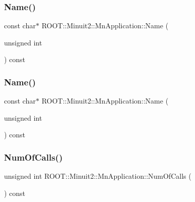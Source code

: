 \subsubsection{\texorpdfstring{Name()}{Name()}\hspace{0.1cm}{\footnotesize\ttfamily [2/3]}}
{\footnotesize\ttfamily const char$\ast$ R\+O\+O\+T\+::\+Minuit2\+::\+Mn\+Application\+::\+Name (\begin{DoxyParamCaption}\item[{unsigned int}]{ }\end{DoxyParamCaption}) const}

\mbox{\label{classROOT_1_1Minuit2_1_1MnApplication_af970f4c896be2d56b2bfb33a8e6e33c9}} 
\subsubsection{\texorpdfstring{Name()}{Name()}\hspace{0.1cm}{\footnotesize\ttfamily [3/3]}}
{\footnotesize\ttfamily const char$\ast$ R\+O\+O\+T\+::\+Minuit2\+::\+Mn\+Application\+::\+Name (\begin{DoxyParamCaption}\item[{unsigned int}]{ }\end{DoxyParamCaption}) const}

\mbox{\label{classROOT_1_1Minuit2_1_1MnApplication_a089843f663ccb31fcca2e58016ec7e9d}} 
\subsubsection{\texorpdfstring{NumOfCalls()}{NumOfCalls()}\hspace{0.1cm}{\footnotesize\ttfamily [1/3]}}
{\footnotesize\ttfamily unsigned int R\+O\+O\+T\+::\+Minuit2\+::\+Mn\+Application\+::\+Num\+Of\+Calls (\begin{DoxyParamCaption}{ }\end{DoxyParamCaption}) const\hspace{0.3cm}{\ttfamily [inline]}}

